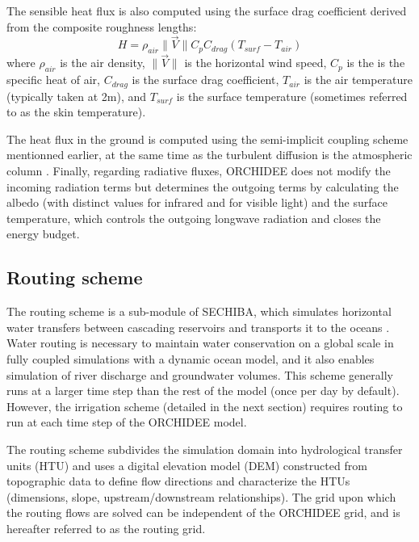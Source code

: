 The sensible heat flux is also computed using the surface drag coefficient derived from the composite roughness lengths:
\begin{equation}
    H = \rho_{air}  \lVert \vec{V} \rVert C_p C_{drag} (T_{surf} - T_{air})
\end{equation}
where $\rho_{air}$ is the air density, $\lVert \vec{V} \rVert$ is the horizontal wind speed, $C_p$ is the is the specific heat of air, $C_{drag}$ is the surface drag coefficient, $T_{air}$ is the air temperature (typically taken at 2m), and $T_{surf}$ is the surface temperature (sometimes referred to as the skin temperature).

The heat flux in the ground is computed using the semi-implicit coupling scheme mentionned earlier, at the same time as the turbulent diffusion is the atmospheric column \citep{polcher_proposal_1998}. 
Finally, regarding radiative fluxes, ORCHIDEE does not modify the incoming radiation terms but determines the outgoing terms by calculating the albedo (with distinct values for infrared and for visible light) and the surface temperature, which controls the outgoing longwave radiation and closes the energy budget.

\subsection{Routing scheme}
\label{section:routing_methods}
The routing scheme is a sub-module of SECHIBA, which simulates horizontal water transfers between cascading reservoirs and transports it to the oceans \citep{ducharne_development_2003, ngo-duc_validation_2007}. 
Water routing is necessary to maintain water conservation on a global scale in fully coupled simulations with a dynamic ocean model, and it also enables simulation of river discharge and groundwater volumes. 
This scheme generally runs at a larger time step than the rest of the model (once per day by default). However, the irrigation scheme (detailed in the next section) requires routing to run at each time step of the ORCHIDEE model.

The routing scheme subdivides the simulation domain into hydrological transfer units (HTU) and uses a digital elevation model (DEM) constructed from topographic data to define flow directions and characterize the HTUs (dimensions, slope, upstream/downstream relationships). The grid upon which the routing flows are solved can be independent of the ORCHIDEE grid, and is hereafter referred to as the routing grid.

